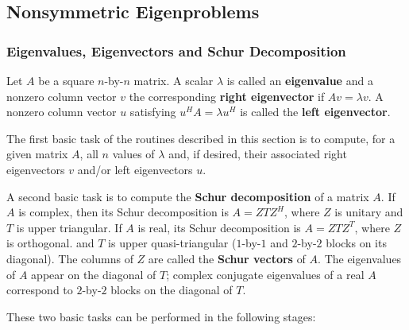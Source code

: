 
\subsection{Nonsymmetric Eigenproblems}\label{subseccompnep}

\subsubsection{Eigenvalues, Eigenvectors and Schur Decomposition}
Let $A$ be a square $n$-by-$n$ matrix. A scalar $\lambda$ is called
an {\bf eigenvalue} and a nonzero column vector $v$ the corresponding
{\bf right eigenvector} if $Av = \lambda v$. A nonzero column vector $u$
satisfying $u^H A = \lambda u^H$
is called the {\bf left eigenvector}.

The first basic task
of the routines described in this section
is to compute, for a given matrix $A$,  all $n$ values of $\lambda$ and,
if desired, their associated right eigenvectors $v$ and/or
left eigenvectors $u$.

A second basic task is to compute the {\bf Schur decomposition} of a matrix $A$.
If $A$ is complex, then its Schur decomposition is $A=ZTZ^H$, where
$Z$ is unitary and $T$ is upper triangular. If $A$ is real, its
Schur decomposition is $A=ZTZ^T$, where $Z$ is orthogonal.
and $T$ is upper quasi-triangular ($1$-by-$1$ and $2$-by-$2$ blocks on
its diagonal).
The columns of $Z$ are called the {\bf Schur vectors } of $A$.
The eigenvalues of $A$ appear on the diagonal of $T$; complex conjugate
eigenvalues of a real $A$ correspond to $2$-by-$2$ blocks on the diagonal of $T$.

These two basic tasks can be performed in the following stages:

